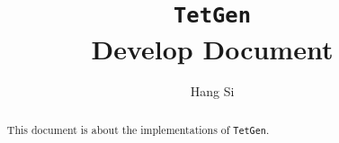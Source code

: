\documentclass[a4paper,11pt]{report}
\begin{document}
\title{{\tt TetGen}\\ Develop Document}
\author{Hang Si}
\maketitle
\begin{abstract}\centering
This document is about the implementations of {\tt TetGen}.
\end{abstract}
\tableofcontents




\end{document}
